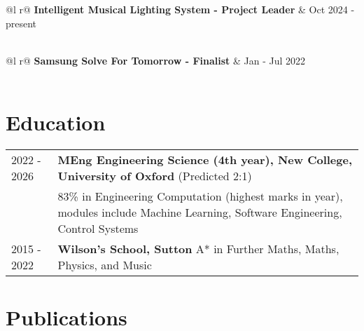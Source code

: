\documentclass[a4paper,12pt]{article}
\begin{document}
\begin{tabularx}{\linewidth}{ @{}l r@{} }
\textbf{Intelligent Musical Lighting System - Project Leader} & \hfill Oct 2024 - present \\[3.75pt]
  \\
\end{tabularx}

\begin{tabularx}{\linewidth}{ @{}l r@{} }
\textbf{Samsung Solve For Tomorrow - Finalist} & \hfill Jan - Jul 2022 \\[3.75pt]
  \\
\end{tabularx}

\section{Education}
\begin{tabularx}{\linewidth}{@{}l X@{}}
2022 - 2026 & \textbf{MEng Engineering Science (4th year), New College, University of Oxford} \hfill \normalsize (Predicted 2:1) \\
& 83\% in Engineering Computation (highest marks in year), modules include Machine Learning, Software Engineering, Control Systems \\[8pt]

2015 - 2022 & \textbf{Wilson's School, Sutton} \hfill A* in Further Maths, Maths, Physics, and Music \\
\end{tabularx}

\section{Publications}
\begin{refsection}
\nocite{*}
\printbibliography[heading=none]
\end{refsection}
\end{document}
